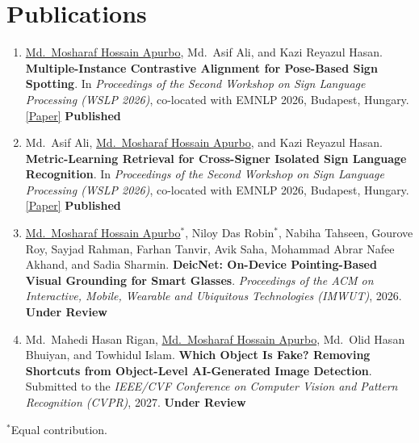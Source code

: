 \documentclass[10pt,a4paper]{article}
\newcommand{\blink}[2]{\href{#1}{\textcolor{linkblue}{#2}}}
\newcommand{\published}{\colorbox{pubgreen}{\textcolor{pubgreentext}{\scriptsize\textbf{Published}}}}
\newcommand{\underreview}{\colorbox{revorange}{\textcolor{revorangetext}{\scriptsize\textbf{Under Review}}}}
\begin{document}
\section{Publications}
\begin{enumerate}
  \item \underline{Md.\ Mosharaf Hossain Apurbo}, Md.\ Asif Ali, and Kazi Reyazul Hasan. \textbf{Multiple-Instance Contrastive Alignment for Pose-Based Sign Spotting}. In \textit{Proceedings of the Second Workshop on Sign Language Processing (WSLP 2026)}, co-located with EMNLP 2026, Budapest, Hungary. \blink{https://aclanthology.org/2026.wslp-1.8/}{[Paper]} \published
  \item Md.\ Asif Ali, \underline{Md.\ Mosharaf Hossain Apurbo}, and Kazi Reyazul Hasan. \textbf{Metric-Learning Retrieval for Cross-Signer Isolated Sign Language Recognition}. In \textit{Proceedings of the Second Workshop on Sign Language Processing (WSLP 2026)}, co-located with EMNLP 2026, Budapest, Hungary. \blink{https://aclanthology.org/2026.wslp-1.7/}{[Paper]} \published
  \item \underline{Md.\ Mosharaf Hossain Apurbo}$^{*}$, Niloy Das Robin$^{*}$, Nabiha Tahseen, Gourove Roy, Sayjad Rahman, Farhan Tanvir, Avik Saha, Mohammad Abrar Nafee Akhand, and Sadia Sharmin. \textbf{DeicNet: On-Device Pointing-Based Visual Grounding for Smart Glasses}. \textit{Proceedings of the ACM on Interactive, Mobile, Wearable and Ubiquitous Technologies (IMWUT)}, 2026. \underreview
  \item Md.\ Mahedi Hasan Rigan, \underline{Md.\ Mosharaf Hossain Apurbo}, Md.\ Olid Hasan Bhuiyan, and Towhidul Islam. \textbf{Which Object Is Fake? Removing Shortcuts from Object-Level AI-Generated Image Detection}. Submitted to the \textit{IEEE/CVF Conference on Computer Vision and Pattern Recognition (CVPR)}, 2027. \underreview
\end{enumerate}

{\footnotesize $^{*}$Equal contribution.}
 
\end{document}
